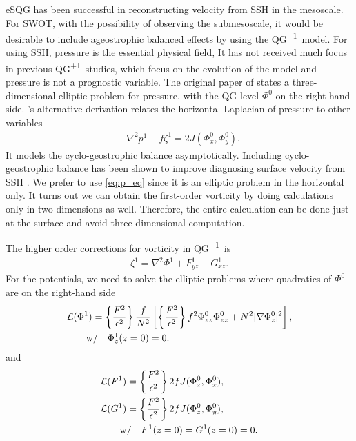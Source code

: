 \documentclass[11pt,letterpaper]{article}
\newcommand{\pl}{\textsuperscript{+1}}
\newcommand{\Ub}{\left\{\frac{F^2}{\epsilon^2}\right\}}
\begin{document}
eSQG has been successful in reconstructing velocity from SSH in the mesoscale. For SWOT, with the possibility of observing the submesoscale, it would be desirable to include ageostrophic balanced effects by using the QG\pl~model.
For using SSH, pressure is the essential physical field, It has not received much focus in previous QG\pl~studies, which focus on the evolution of the model and pressure is not a prognostic variable. The original paper of \cite{MurakiEtAl_99} states a three-dimensional elliptic problem for pressure, with the QG-level $\Phi^0$ on the right-hand side. \cite{Vallis_96a}'s alternative derivation relates the horizontal Laplacian of pressure to other variables 
\begin{align}
    &\nabla^2 p^1-f\zeta^1 = 2J(\Phi^0_x,\Phi^0_y).\label{eq:p_eq}
\end{align}
It models the cyclo-geostrophic balance asymptotically. Including cyclo-geostrophic balance has been shown to improve diagnosing surface velocity from SSH \citep{PenvenEtAl_14}. We prefer to use \eqref{eq:p_eq} since it is an elliptic problem in the horizontal only. It turns out we can obtain the first-order vorticity by doing calculations only in two dimensions as well. Therefore, the entire calculation can be done just at the surface and avoid three-dimensional computation. 

The higher order corrections for vorticity in QG\pl~is
\begin{align}
    \zeta^1 = \nabla^2\Phi^1+F^1_{yz}-G^1_{xz}.
\end{align}
For the potentials, we need to solve the elliptic problems where quadratics of $\Phi^0$ are on the right-hand side
\begin{align}
    &\mathcal{L}(\Phi^1)
    = \Ub \frac{f}{N^2} \left[\Ub f^2\Phi^0_{zz}\Phi^0_{zz}+N^2|\nabla\Phi^0_z|^2\right],\label{eq:Phi_inv}\\
    &\quad \qdt{w/} \Phi^{1}_z(z=0) = 0.
\end{align}
and
\begin{align}
    &\mathcal{L}(F^1) = \Ub 2f J(\Phi_z^0,\Phi_x^0),\label{eq:F_inv}\\
    &\mathcal{L}(G^1) = \Ub 2f J(\Phi_z^0,\Phi_y^0),\label{eq:G_inv}\\
    &\quad \qdt{w/} F^1(z=0)=G^1(z=0)=0.
\end{align}
\end{document}
